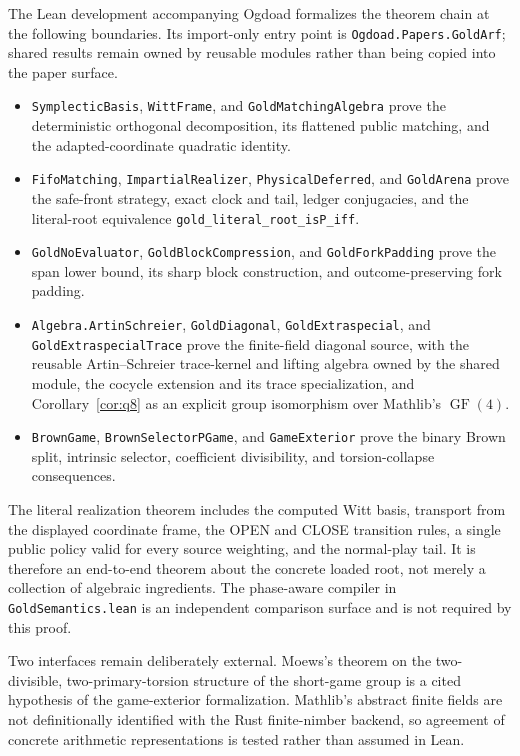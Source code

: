 \documentclass[11pt]{article}
\theoremstyle{definition}
\theoremstyle{remark}
\begin{document}
The Lean development accompanying Ogdoad \cite{ogdoad2026} formalizes the
theorem chain at the following boundaries.  Its import-only entry point is
\texttt{Ogdoad.Papers.}\allowbreak\texttt{GoldArf}; shared results remain owned by reusable
modules rather than being copied into the paper surface.
\begin{itemize}
\item \texttt{SymplecticBasis}, \texttt{WittFrame}, and
      \texttt{GoldMatchingAlgebra} prove the deterministic orthogonal
      decomposition, its flattened public matching, and the
      adapted-coordinate quadratic identity.
\item \texttt{FifoMatching}, \texttt{ImpartialRealizer},
      \texttt{PhysicalDeferred}, and \texttt{GoldArena} prove the safe-front
      strategy, exact clock and tail, ledger conjugacies, and the literal-root
      equivalence \texttt{gold\_literal\_root\_isP\_iff}.
\item \texttt{GoldNoEvaluator}, \texttt{GoldBlockCompression}, and
      \texttt{GoldForkPadding} prove the span lower bound, its sharp block
      construction, and outcome-preserving fork padding.
\item \texttt{Algebra.ArtinSchreier}, \texttt{GoldDiagonal},
      \texttt{GoldExtraspecial}, and
      \texttt{GoldExtraspecialTrace} prove the finite-field diagonal source,
      with the reusable Artin--Schreier trace-kernel and lifting algebra owned
      by the shared module, the cocycle extension and its trace specialization, and
      Corollary~\ref{cor:q8} as an explicit group isomorphism over Mathlib's
      $\operatorname{GF}(4)$.
\item \texttt{BrownGame}, \texttt{BrownSelectorPGame}, and
      \texttt{GameExterior} prove the binary Brown split, intrinsic selector,
      coefficient divisibility, and torsion-collapse consequences.
\end{itemize}

The literal realization theorem includes the computed Witt basis,
transport from the displayed coordinate frame, the OPEN and CLOSE transition
rules, a single public policy valid for every source weighting, and the
normal-play tail.  It is therefore an end-to-end theorem about the concrete
loaded root, not merely a collection of algebraic ingredients.  The
phase-aware compiler in \texttt{GoldSemantics.lean} is an independent
comparison surface and is not required by this proof.

Two interfaces remain deliberately external.  Moews's theorem on the
two-divisible, two-primary-torsion structure of the short-game group is a
cited hypothesis of the game-exterior formalization.  Mathlib's abstract
finite fields are not definitionally identified with the Rust finite-nimber
backend, so agreement of concrete arithmetic representations is tested rather
than assumed in Lean.
\end{document}
